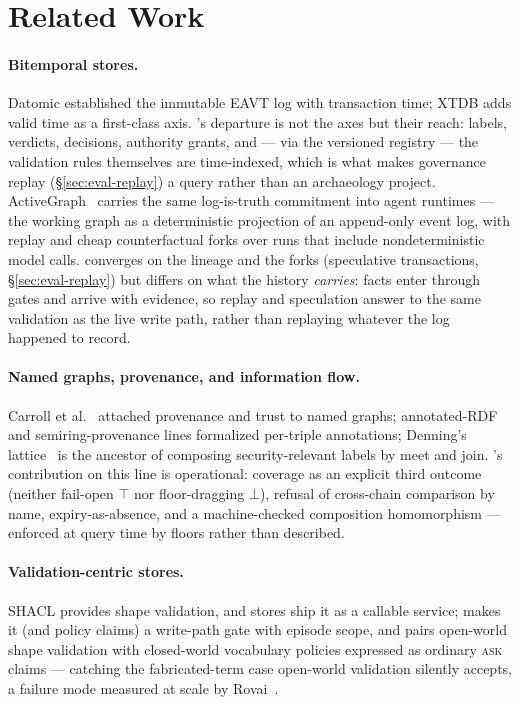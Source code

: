 \section{Related Work}
\label{sec:related}

\paragraph{Bitemporal stores.}
Datomic established the immutable EAVT log with transaction time;
XTDB adds valid time as a first-class axis. \sys's departure is not
the axes but their reach: labels, verdicts, decisions, authority
grants, and --- via the versioned registry --- the validation rules
themselves are time-indexed, which is what makes governance replay
(\S\ref{sec:eval-replay}) a query rather than an archaeology project.
ActiveGraph~\cite{nakajima2026log} carries the same log-is-truth
commitment into agent runtimes --- the working graph as a
deterministic projection of an append-only event log, with replay and
cheap counterfactual forks over runs that include nondeterministic
model calls. \sys converges on the lineage and the forks (speculative
transactions, \S\ref{sec:eval-replay}) but differs on what the history
\emph{carries}: facts enter through gates and arrive with evidence, so
replay and speculation answer to the same validation as the live write
path, rather than replaying whatever the log happened to record.

\paragraph{Named graphs, provenance, and information flow.}
Carroll et al.~\cite{carroll2005named} attached provenance and trust
to named graphs; annotated-RDF and semiring-provenance lines
formalized per-triple annotations; Denning's
lattice~\cite{denning1976lattice} is the ancestor of composing
security-relevant labels by meet and join. \sys's contribution on
this line is operational: coverage as an explicit third outcome
(neither fail-open $\top$ nor floor-dragging $\bot$), refusal of
cross-chain comparison by name, expiry-as-absence, and a
machine-checked composition homomorphism --- enforced at query time by
floors rather than described.

\paragraph{Validation-centric stores.}
SHACL provides shape validation, and stores ship it as a callable
service; \sys makes it (and policy claims) a write-path gate with
episode scope, and pairs open-world shape validation with closed-world
vocabulary policies expressed as ordinary \textsc{ask} claims ---
catching the fabricated-term case open-world validation silently
accepts, a failure mode measured at scale by
Rovai~\cite{rovai2026openontologies}.


